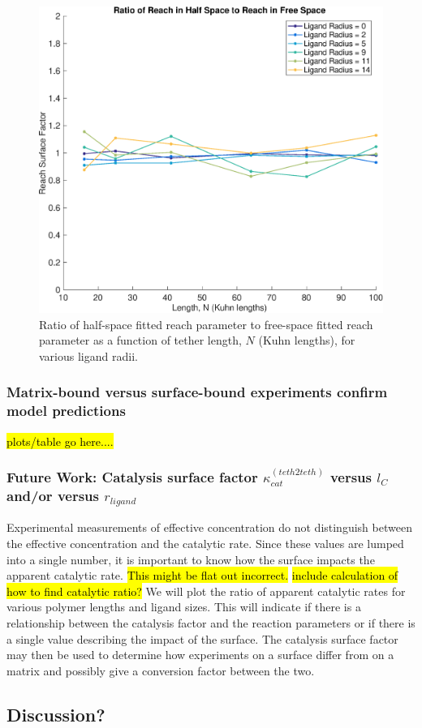\documentclass[../../AdvancementSummary.tex]{subfiles}
\begin{document}
\begin{figure}[H]
    \begin{center}
        		\includegraphics[width=0.7\linewidth]{ResultsFigures/ReachSurfaceFactor/ReachSurfaceFactor.eps}
        \caption{Ratio of half-space fitted reach parameter to free-space fitted reach parameter as a function of tether length, $N$ (Kuhn lengths), for various ligand radii. \label{fig: ReachSurfaceFactor}}
    \end{center}
\end{figure}


\subsubsection{Matrix-bound versus surface-bound experiments confirm model predictions}


\hl{plots/table go here....}

\subsubsection{Future Work: Catalysis surface factor $\kappa^{(teth2teth)}_{cat}$ versus $l_C$ and/or versus $r_{ligand}$}

Experimental measurements of effective concentration do not distinguish between the effective concentration and the catalytic rate. Since these values are lumped into a single number, it is important to know how the surface impacts the apparent catalytic rate.  \hl{This might be flat out incorrect.} \hl{ include calculation of how to find catalytic ratio?} We will plot the ratio of apparent catalytic rates for various polymer lengths and ligand sizes. This will indicate if there is a relationship between the catalysis factor and the reaction parameters or if there is a single value describing the impact of the surface. The catalysis surface factor may then be used to determine how experiments on a surface differ from on a matrix and possibly give a conversion factor between the two.

\subsection{Discussion?}









\end{document}
